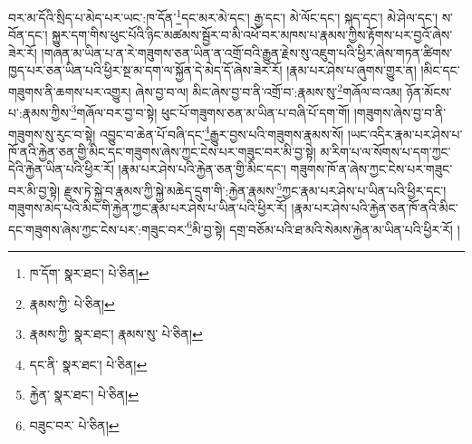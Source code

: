 བར་མ་དོའི་སྲིད་པ་མེད་པར་ཡང་:ཁ་དོན་\footnote{ཁ་དོག་  སྣར་ཐང་།  པེ་ཅིན། }དང་མར་མེ་དང་། རྒྱ་དང་། མེ་ལོང་དང་། སྐད་དང་། མེ་ཤེལ་དང་། ས་བོན་དང་། སྐྱུར་དག་གིས་ཕུང་པོའི་ཉིང་མཚམས་སྦྱོར་བ་མི་འཕོ་བར་མཁས་པ་རྣམས་ཀྱིས་རྟོགས་པར་བྱའོ་ཞེས་ཟེར་རོ། །གཞན་མ་ཡིན་པ་ན་རེ་གཟུགས་ཅན་ཡིན་ན་འགྲོ་བའི་རྒྱུན་རྗེས་སུ་འཇུག་པའི་ཕྱིར་ཞེས་གཏན་ཚིགས་ཁྱད་པར་ཅན་ཡིན་པའི་ཕྱིར་སྔ་མ་དག་ལ་སྐྱོན་དེ་མེད་དོ་ཞེས་ཟེར་རོ། །རྣམ་པར་ཤེས་པ་ཞུགས་གྱུར་ན། །མིང་དང་གཟུགས་ནི་ཆགས་པར་འགྱུར། ཞེས་བྱ་བ་ལ། མིང་ཞེས་བྱ་བ་ནི་འགྲོ་བ་:རྣམས་སུ་\footnote{རྣམས་ཀྱི་  པེ་ཅིན། }གཞོལ་བ་འམ། ཉོན་མོངས་པ་:རྣམས་ཀྱིས་\footnote{རྣམས་ཀྱི་  སྣར་ཐང་། རྣམས་སུ་  པེ་ཅིན། }གཞོལ་བར་བྱ་བ་སྟེ། ཕུང་པོ་གཟུགས་ཅན་མ་ཡིན་པ་བཞི་པོ་དག་གོ། །གཟུགས་ཞེས་བྱ་བ་ནི་གཟུགས་སུ་རུང་བ་སྟེ། འབྱུང་བ་ཆེན་པོ་བཞི་དང་\footnote{དང་ནི་  སྣར་ཐང་།  པེ་ཅིན། }རྒྱུར་བྱས་པའི་གཟུགས་རྣམས་སོ། །ཡང་འདིར་རྣམ་པར་ཤེས་པ་ཁོ་ནའི་རྐྱེན་ཅན་གྱི་མིང་དང་གཟུགས་ཞེས་ཀྱང་ངེས་པར་གཟུང་བར་མི་བྱ་སྟེ། མ་རིག་པ་ལ་སོགས་པ་དག་ཀྱང་དེའི་རྐྱེན་ཡིན་པའི་ཕྱིར་རོ། །རྣམ་པར་ཤེས་པའི་རྐྱེན་ཅན་གྱི་མིང་དང་། གཟུགས་ཁོ་ན་ཞེས་ཀྱང་ངེས་པར་གཟུང་བར་མི་བྱ་སྟེ། རྫུས་ཏེ་སྐྱེ་བ་རྣམས་ཀྱི་སྐྱེ་མཆེད་དྲུག་གི་:རྐྱེན་རྣམས་\footnote{རྐྱེན་  སྣར་ཐང་།  པེ་ཅིན། }ཀྱང་རྣམ་པར་ཤེས་པ་ཡིན་པའི་ཕྱིར་དང་། གཟུགས་མེད་པའི་མིང་གི་རྐྱེན་ཀྱང་རྣམ་པར་ཤེས་པ་ཡིན་པའི་ཕྱིར་རོ། །རྣམ་པར་ཤེས་པའི་རྐྱེན་ཅན་ཁོ་ནའི་མིང་དང་གཟུགས་ཞེས་ཀྱང་ངེས་པར་:གཟུང་བར་\footnote{བཟུང་བར་  པེ་ཅིན། }མི་བྱ་སྟེ། དགྲ་བཅོམ་པའི་ཐ་མའི་སེམས་རྐྱེན་མ་ཡིན་པའི་ཕྱིར་རོ། །
